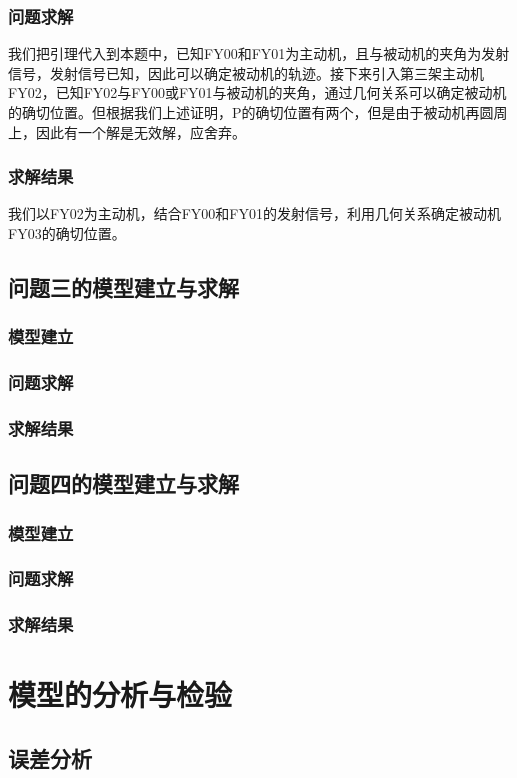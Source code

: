 \documentclass[withoutpreface,bwprint]{cumcmthesis} %
\begin{document}
\subsubsection{问题求解}
我们把引理代入到本题中，已知FY00和FY01为主动机，且与被动机的夹角为发射信号，发射信号已知，因此可以确定被动机的轨迹。接下来引入第三架主动机FY02，已知FY02与FY00或FY01与被动机的夹角，通过几何关系可以确定被动机的确切位置。但根据我们上述证明，P的确切位置有两个，但是由于被动机再圆周上，因此有一个解是无效解，应舍弃。
\subsubsection{求解结果}
我们以FY02为主动机，结合FY00和FY01的发射信号，利用几何关系确定被动机FY03的确切位置。

\subsection{问题三的模型建立与求解}
\subsubsection{模型建立}
\subsubsection{问题求解}
\subsubsection{求解结果}


\subsection{问题四的模型建立与求解}
\subsubsection{模型建立}
\subsubsection{问题求解}
\subsubsection{求解结果}

\section{模型的分析与检验}
\subsection{误差分析}
\end{document}
